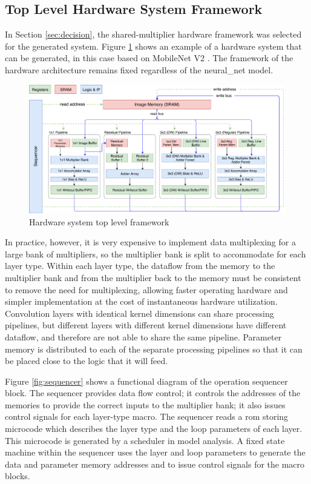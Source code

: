 \documentclass{uw-ece-wkrpt}
\begin{document}
\subsection{Top Level Hardware System Framework}\label{sec:top_level_framework}

In Section \ref{sec:decision}, the shared-multiplier hardware framework was selected for the generated system. Figure \ref{fig:top_level} shows an example of a hardware system that can be generated, in this case based on MobileNet V2 \cite{Howard2017MobileNets:-Eff}. The framework of the hardware architecture remains fixed regardless of the \gls{neural_net} model.

\begin{figure}
\centering
\includegraphics[width=\textwidth]{figures/top_level}
\caption{Hardware system top level framework}\label{fig:top_level}
\end{figure}

In practice, however, it is very expensive to implement data multiplexing for a large bank of multipliers, so the multiplier bank is split to accommodate for each layer type. Within each layer type, the dataflow from the memory to the multiplier bank and from the multiplier back to the memory must be consistent to remove the need for multiplexing, allowing faster operating hardware and simpler implementation at the cost of instantaneous hardware utilization. Convolution layers with identical \gls{kernel} dimensions can share processing pipelines, but different layers with different \gls{kernel} dimensions have different dataflow, and therefore are not able to share the same pipeline. Parameter memory is distributed to each of the separate processing pipelines so that it can be placed close to the logic that it will feed.

Figure \ref{fig:sequencer} shows a functional diagram of the operation sequencer block. The sequencer provides data flow control; it controls the addresses of the memories to provide the correct inputs to the multiplier bank; it also issues control signals for each layer-type macro. The sequencer reads a \gls{rom} storing microcode which describes the layer type and the loop parameters of each layer. This microcode is generated by a scheduler in model analysis. A fixed state machine within the sequencer uses the layer and loop parameters to generate the data and parameter memory addresses and to issue control signals for the macro blocks.
\end{document}

